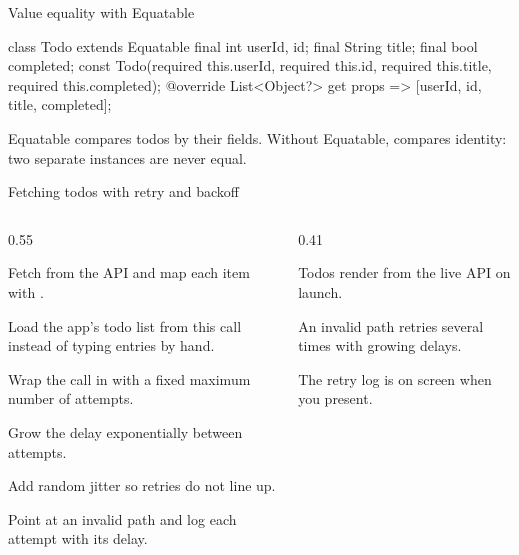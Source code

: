 \documentclass[10pt,aspectratio=169,t]{beamer}
\begin{document}
\begin{frame}[fragile,eyebrow=Reference]{Value equality with Equatable}
\begin{dart}
class Todo extends Equatable {
  final int userId, id;
  final String title;
  final bool completed;
  const Todo({required this.userId,
      required this.id, required this.title,
      required this.completed});
  @override
  List<Object?> get props => [userId, id, title, completed];
}
\end{dart}
  \begin{takeaway}{Equatable compares todos by their fields.}
    Without Equatable, \code{==} compares identity: two separate instances are never equal.
  \end{takeaway}
\end{frame}

\begin{frame}[eyebrow=Task II]{Fetching todos with retry and backoff}
  \begin{columns}[T]
    \begin{column}{0.55\textwidth}
      \begin{steps}
        \item Fetch  from the API and map each item with .
        \item Load the app's todo list from this call instead of typing entries by hand.
        \item Wrap the call in  with a fixed maximum number of attempts.
        \item Grow the delay exponentially between attempts.
        \item Add random jitter so retries do not line up.
        \item Point at an invalid path and log each attempt with its delay.
      \end{steps}
    \end{column}
    \begin{column}{0.41\textwidth}
      \begin{checklist}
        \item Todos render from the live API on launch.
        \item An invalid path retries several times with growing delays.
        \item The retry log is on screen when you present.
      \end{checklist}
    \end{column}
  \end{columns}
\end{frame}
\end{document}
